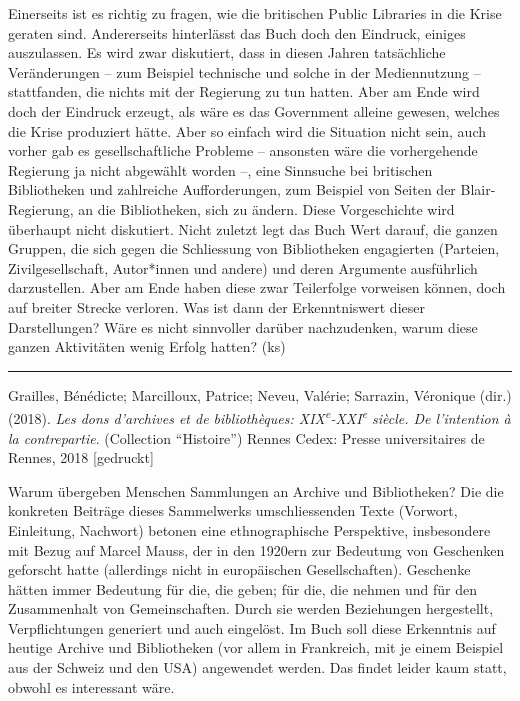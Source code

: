 \documentclass[a4paper,
fontsize=11pt,
oneside,
numbers=noperiodatend,
parskip=half-,
bibliography=totoc,
final
]{scrartcl}
\begin{document}
Einerseits ist es richtig zu fragen, wie die britischen Public Libraries
in die Krise geraten sind. Andererseits hinterlässt das Buch doch den
Eindruck, einiges auszulassen. Es wird zwar diskutiert, dass in diesen
Jahren tatsächliche Veränderungen -- zum Beispiel technische und solche
in der Mediennutzung -- stattfanden, die nichts mit der Regierung zu tun
hatten. Aber am Ende wird doch der Eindruck erzeugt, als wäre es das
Government alleine gewesen, welches die Krise produziert hätte. Aber so
einfach wird die Situation nicht sein, auch vorher gab es
gesellschaftliche Probleme -- ansonsten wäre die vorhergehende Regierung
ja nicht abgewählt worden --, eine Sinnsuche bei britischen Bibliotheken
und zahlreiche Aufforderungen, zum Beispiel von Seiten der
Blair-Regierung, an die Bibliotheken, sich zu ändern. Diese
Vorgeschichte wird überhaupt nicht diskutiert. Nicht zuletzt legt das
Buch Wert darauf, die ganzen Gruppen, die sich gegen die Schliessung von
Bibliotheken engagierten (Parteien, Zivilgesellschaft, Autor*innen und
andere) und deren Argumente ausführlich darzustellen. Aber am Ende haben
diese zwar Teilerfolge vorweisen können, doch auf breiter Strecke
verloren. Was ist dann der Erkenntniswert dieser Darstellungen? Wäre es
nicht sinnvoller darüber nachzudenken, warum diese ganzen Aktivitäten
wenig Erfolg hatten? (ks)

\begin{center}\rule{0.5\linewidth}{0.5pt}\end{center}

Grailles, Bénédicte; Marcilloux, Patrice; Neveu, Valérie; Sarrazin,
Véronique (dir.) (2018). \emph{Les dons d'archives et de bibliothèques:
XIX\textsuperscript{e}-XXI\textsuperscript{e} siècle. De l'intention à
la contrepartie}. (Collection \enquote{Histoire}) Rennes Cedex: Presse
universitaires de Rennes, 2018 {[}gedruckt{]}

Warum übergeben Menschen Sammlungen an Archive und Bibliotheken? Die die
konkreten Beiträge dieses Sammelwerks umschliessenden Texte (Vorwort,
Einleitung, Nachwort) betonen eine ethnographische Perspektive,
insbesondere mit Bezug auf Marcel Mauss, der in den 1920ern zur
Bedeutung von Geschenken geforscht hatte (allerdings nicht in
europäischen Gesellschaften). Geschenke hätten immer Bedeutung für die,
die geben; für die, die nehmen und für den Zusammenhalt von
Gemeinschaften. Durch sie werden Beziehungen hergestellt,
Verpflichtungen generiert und auch eingelöst. Im Buch soll diese
Erkenntnis auf heutige Archive und Bibliotheken (vor allem in
Frankreich, mit je einem Beispiel aus der Schweiz und den USA)
angewendet werden. Das findet leider kaum statt, obwohl es interessant
wäre.
\end{document}
